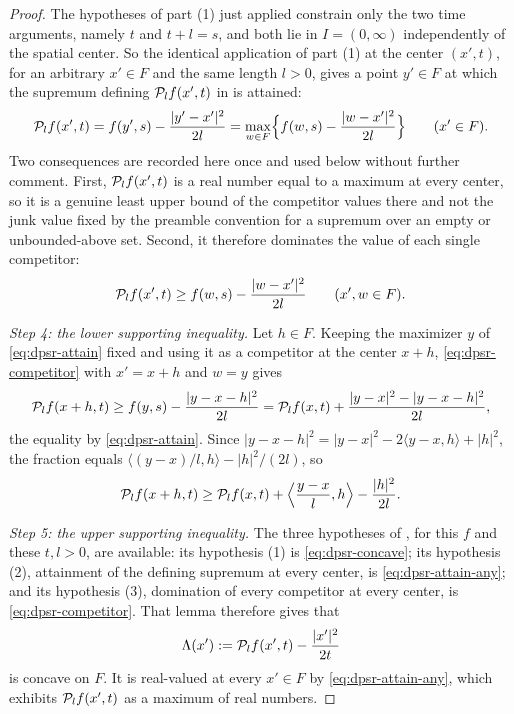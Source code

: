 \begin{proof}
The hypotheses of part (1) just applied constrain only the two time arguments,
namely $t$ and $t+l=s$, and both lie in $I=(0,\infty)$ independently of the
spatial center. So the identical application of part (1) at the center
$(x',t)$, for an arbitrary $x'\in F$ and the same length $l>0$, gives a point
$y'\in F$ at which the supremum defining $\mathcal{P}_lf(x',t)$ in
 is attained:
\begin{equation}\label{eq:dpsr-attain-any}
  \mathcal{P}_lf(x',t)=f(y',s)-\frac{|y'-x'|^2}{2l}
   =\max_{w\in F}\Bigl\{f(w,s)-\frac{|w-x'|^2}{2l}\Bigr\}
  \qquad(x'\in F).
\end{equation}
Two consequences are recorded here once and used below without further comment.
First, $\mathcal{P}_lf(x',t)$ is a real number equal to a maximum at every center, so
it is a genuine least upper bound of the competitor values there and not the
junk value fixed by the preamble convention for a supremum over an empty or
unbounded-above set. Second, it therefore dominates the value of each single
competitor:
\begin{equation}\label{eq:dpsr-competitor}
  \mathcal{P}_lf(x',t)\ge f(w,s)-\frac{|w-x'|^2}{2l}\qquad(x',w\in F).
\end{equation}

\emph{Step 4: the lower supporting inequality.}
Let $h\in F$. Keeping the maximizer $y$ of \eqref{eq:dpsr-attain} fixed and
using it as a competitor at the center $x+h$, \eqref{eq:dpsr-competitor} with
$x'=x+h$ and $w=y$ gives
\[
  \mathcal{P}_lf(x+h,t)\ge f(y,s)-\frac{|y-x-h|^2}{2l}
   =\mathcal{P}_lf(x,t)+\frac{|y-x|^2-|y-x-h|^2}{2l},
\]
the equality by \eqref{eq:dpsr-attain}. Since
$|y-x-h|^2=|y-x|^2-2\langle y-x,h\rangle+|h|^2$, the fraction equals
$\langle(y-x)/l,h\rangle-|h|^2/(2l)$, so
\begin{equation}\label{eq:dp-lower-support}
  \mathcal{P}_lf(x+h,t)\ge\mathcal{P}_lf(x,t)
    +\Bigl\langle\frac{y-x}{l},h\Bigr\rangle-\frac{|h|^2}{2l}.
\end{equation}

\emph{Step 5: the upper supporting inequality.}
The three hypotheses of , for this $f$ and these
$t,l>0$, are available: its hypothesis (1) is \eqref{eq:dpsr-concave}; its hypothesis (2),
attainment of the defining supremum at every center, is
\eqref{eq:dpsr-attain-any}; and its hypothesis (3), domination of every competitor at
every center, is \eqref{eq:dpsr-competitor}. That lemma therefore gives that
\[
  \Lambda(x'):=\mathcal{P}_lf(x',t)-\frac{|x'|^2}{2t}
\]
is concave on $F$. It is real-valued at every $x'\in F$ by
\eqref{eq:dpsr-attain-any}, which exhibits $\mathcal{P}_lf(x',t)$ as a maximum of real
numbers.


\end{proof}
